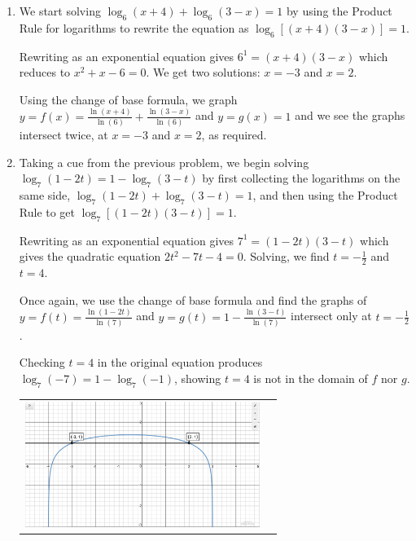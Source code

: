 \begin{ex}
\begin{enumerate}
\begin{center}
\end{center}


\item We  start solving $\log_{6}(x+4) + \log_{6}(3-x) = 1$ by using the Product Rule for logarithms to rewrite the equation as  $\log_{6}\left[(x+4)(3-x)\right] = 1$.  

\smallskip

Rewriting as an exponential equation gives $6^{1} = (x+4)(3-x)$ which reduces to $x^2+x-6 = 0$.  We get two solutions: $x=-3$ and $x=2$.   

\smallskip

Using the change of base formula, we graph  $y=f(x) =  \frac{\ln(x+4)}{\ln(6)} + \frac{\ln(3-x)}{\ln(6)}$ and $y=g(x) = 1$ and we see the graphs intersect twice, at $x=-3$ and $x=2$, as required.

\item  Taking a cue from the previous problem, we begin solving $\log_{7}(1-2t) = 1 - \log_{7}(3-t)$ by first collecting the logarithms on the same side, $\log_{7}(1-2t) +  \log_{7}(3-t) = 1$, and then using the Product Rule to get $\log_{7}[(1-2t)(3-t)] = 1$.  

\smallskip

Rewriting  as an exponential equation gives $7^{1} = (1-2t)(3-t)$ which gives the quadratic equation $2t^2-7t-4=0$.  Solving, we find  $t = -\frac{1}{2}$ and $t=4$.  

\smallskip

Once again, we use the change of base formula and find the graphs of  $y = f(t) = \frac{\ln(1-2t)}{\ln(7)}$ and $y=g(t) = 1 - \frac{\ln(3-t)}{\ln(7)}$ intersect only at $t=-\frac{1}{2}$.  

\smallskip

Checking $t=4$ in the original equation produces $\log_{7}(-7) = 1 - \log_{7}(-1)$, showing $t=4$ is not in the domain of $f$ nor $g$.

\begin{center}

\begin{tabular}{cc}

\includegraphics[width=3in]{./LogarithmicEquationsandInequalitiesGraphics/LogEqnEx03.jpg} &


\end{tabular}
\end{center}
\end{enumerate}
\end{ex}
